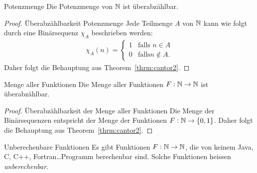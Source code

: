 \begin{corollary}{Potenzmenge}
Die Potenzmenge von $\mathbb{N}$ ist überabzählbar.
\end{corollary}
\begin{proof}{Überabzählbarkeit Potenzmenge}
Jede Teilmenge $A$ von $\mathbb{N}$ kann wie folgt durch eine Binärsequenz $\chi_A$ beschrieben werden:
\begin{align*}
\chi_A(n)=\begin{cases}
1&\text{falls } n\in A\\
0&\text{falls} n\notin A.
\end{cases}
\end{align*}
Daher folgt die Behauptung aus Theorem~\ref{thrm:cantor2}.
\end{proof}

\begin{corollary}{Menge aller Funktionen}
Die Menge aller Funktionen $F:\mathbb{N}\to\mathbb{N}$ ist überabzählbar.
\end{corollary}
\begin{proof}{Überabzählbarkeit der Menge aller Funktionen}
Die Menge der Binärsequenzen entspricht der Menge der Funktionen $F:\mathbb{N}\to\{0,1\}$. Daher folgt die Behauptung aus Theorem~\ref{thrm:cantor2}.
\end{proof}

\begin{corollary}{Unberechenbare Funktionen}
Es gibt Funktionen $F:\mathbb{N}\to\mathbb{N}$, die von keinem Java, C, C++, Fortran\dots Programm berechenbar sind. Solche Funktionen heissen \textit{unberechenbar}.
\end{corollary}



